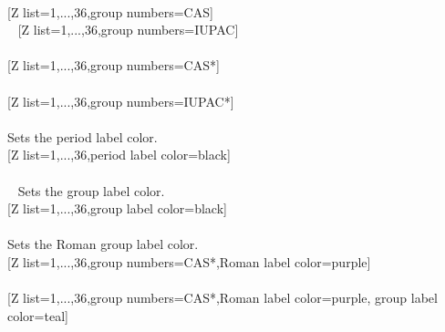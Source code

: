 \\ [5pt][Z list={1,...,36},group numbers=CAS]%
\\ [5pt]\makebox[\linewidth][c]{\scalebox{.6}{\pgfPT[Z list={1,...,36},group numbers=CAS]}}%
\newpage\vspace{-34pt}\ %
[Z list={1,...,36},group numbers=IUPAC]%
\\ [5pt]\makebox[\linewidth][c]{\scalebox{.6}{\pgfPT[Z list={1,...,36},group numbers=IUPAC]}}%
\\ [10pt][Z list={1,...,36},group numbers=CAS*]%
\\ [5pt]\makebox[\linewidth][c]{\scalebox{.6}{\pgfPT[Z list={1,...,36},group numbers=CAS*]}}%
\\ [10pt][Z list={1,...,36},group numbers=IUPAC*]%
\\ [5pt]\makebox[\linewidth][c]{\scalebox{.6}{\pgfPT[Z list={1,...,36},group numbers=IUPAC*]}}%
\\ [0pt]\pgfPTendoption%
\vfill%
\label{option_period label color}%
%
{Sets the period label color.}%
\\ [5pt][Z list={1,...,36},period label color=black]%
\\ [10pt]\makebox[\linewidth][c]{\scalebox{.6}{\pgfPT[Z list={1,...,36},period label color=black]}}%
\\ [0pt]\pgfPTendoption%
\newpage\vspace{-34pt}\ %
\label{option_group label color}%
%
{Sets the group label color.}%
\\ [5pt][Z list={1,...,36},group label color=black]%
\\ [10pt]\makebox[\linewidth][c]{\scalebox{.6}{\pgfPT[Z list={1,...,36},group label color=black]}}%
\\ [0pt]\pgfPTendoption%
\vfill%
\label{option_Roman label color}%
%
{Sets the Roman group label color.}%
\\ [5pt][Z list={1,...,36},group numbers=CAS*,Roman label color=purple]%
\\ [10pt]\makebox[\linewidth][c]{\scalebox{.6}{\pgfPT[Z list={1,...,36},group numbers=CAS*,Roman label color=purple]}}%
\\ [5pt][Z list={1,...,36},group numbers=CAS*,Roman label color=purple, group label color=teal]%
